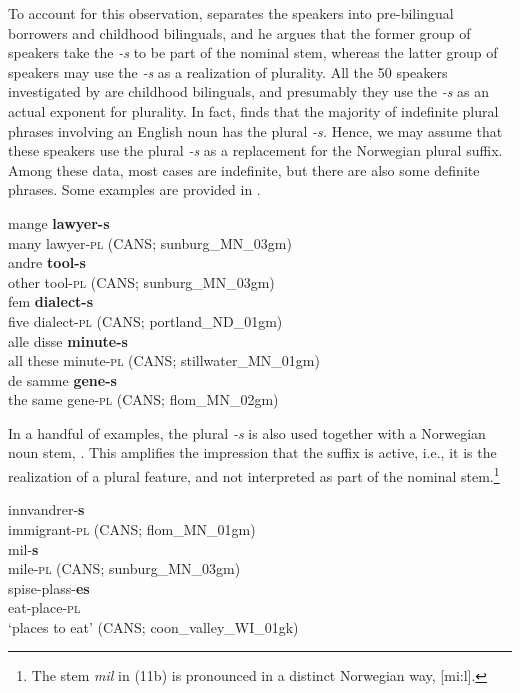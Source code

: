 \documentclass[output=paper]{langscibook}
\begin{document}
To account for this observation, \citet{Haugen1953} separates the speakers into pre-bilingual borrowers and childhood bilinguals, and he argues that the former group of speakers take the \textit{{}-s} to be part of the nominal stem, whereas the latter group of speakers may use the \textit{{}-s} as a realization of plurality. All the 50 speakers investigated by \citet{Riksem2017} are childhood bilinguals, and presumably they use the \textit{{}-s} as an actual exponent for plurality. In fact, \citet{Riksem2017} finds that the majority of indefinite plural phrases involving an English noun has the plural \textit{{}-s.} Hence, we may assume that these speakers use the plural \textit{{}-s} as a replacement for the Norwegian plural suffix. Among these data, most cases are indefinite, but there are also some definite phrases. Some examples are provided in . 


\ea \label{ex:riksem:19}
\ea \label{ex:riksem:19a}
	\gll mange \textbf{lawyer-s}\\
		 many lawyer-\textsc{pl} (CANS; %
         sunburg\_MN\_03gm)\\
\ex \label{ex:riksem:19b}
	\gll andre \textbf{tool-s}\\
		 other tool-\textsc{pl} (CANS; sunburg\_MN\_03gm)\\
\ex \label{ex:riksem:19c}
	\gll fem \textbf{dialect-s}\\
		 five dialect-\textsc{pl} (CANS; portland\_ND\_01gm)\\
\ex \label{ex:riksem:19bd}
	\gll alle disse \textbf{minute-s}\\
		 all these minute-\textsc{pl} (CANS; %
         stillwater\_MN\_01gm)\\
\ex \label{ex:riksem:19be}
	 \gll de samme \textbf{gene-s}\\
		  the same gene-\textsc{pl} (CANS; %
          flom\_MN\_02gm)\\
\z
\z



In a handful of examples, the plural \textit{{}-s} is also used together with a Norwegian noun stem, . This amplifies the impression that the suffix is active, i.e., it is the realization of a plural feature, and not interpreted as part of the nominal stem.\footnote{The stem \emph{mil} in (11b) is pronounced in a distinct Norwegian way, [mi:l].}


\ea\label{ex:riksem:20}
\ea 
	\gll innvandrer-\textbf{s}\\
		 immigrant-\textsc{pl} (CANS; %
         flom\_MN\_01gm)\\
\ex 
	\gll mil-\textbf{s}\\            
		 mile-\textsc{pl} (CANS; sunburg\_MN\_03gm)\\
\ex 
	\gll spise-plass-\textbf{es}\\
		 eat-place-\textsc{pl}\\
	 \glt ‘places to eat’ (CANS; coon\_valley\_WI\_01gk) 
\z
\z
\end{document}
